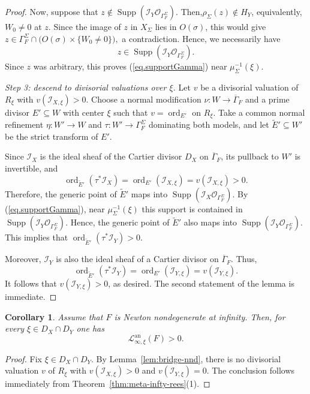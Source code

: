 \documentclass[12pt]{amsart}
\newcommand{\Supp}{\operatorname{\mathrm{Supp}}}
\newcommand{\ord}{\operatorname{\mathrm{ord}}}
\newcommand{\cO}{\mathcal{O}}
\newcommand{\Loj}{\mathcal{L}} %
\theoremstyle{plain}
\newtheorem{corollary}[theorem]{Corollary}
\theoremstyle{definition}
\numberwithin{equation}{section}
\begin{document}
\begin{proof}
	Now, suppose that $z\notin \Supp (\mathscr{I}_Y\cO_{\Gamma_F^\Sigma}).$
	Then,$\rho_\Sigma(z)\notin H_Y$, equivalently, $W_0\neq 0$ at $z$. Since the image of $z$ in
	$X_\Sigma$ lies in $O(\sigma)$, this would give $z\in \Gamma_F^\Sigma\cap \bigl(O(\sigma)\times\{W_0\neq 0\}\bigr),$ a contradiction. Hence, we necessarily have
	\[
	z\in \Supp (\mathscr{I}_Y\cO_{\Gamma_F^\Sigma}).
	\]
	Since $z$ was arbitrary, this proves (\ref{eq.supportGamma}) near $\mu_\Sigma^{-1}(\xi)$.
	
	\smallskip
	\noindent\emph{Step 3: descend to divisorial valuations over $\xi$.}
	Let $v$ be a divisorial valuation of $R_\xi$ with $v(\mathscr{I}_{X,\xi})>0.$
	Choose a normal modification $\nu:W\to \overline{\Gamma}_F$ and a prime divisor $E'\subseteq W$
	with center $\xi$ such that $v=\ord_{E'}$ on $R_\xi$.
	Take a common normal refinement $\eta: W'\to W$ and $\tau: W'\to \Gamma_F^\Sigma$ dominating both models,
	and let $\widetilde E'\subseteq W'$ be the strict transform of $E'$.
	
Since $\mathscr{I}_X$ is the ideal sheaf of the Cartier divisor $D_X$ on $\overline{\Gamma}_F$, its
	pullback to $W'$ is invertible, and
	\[
	\ord_{\widetilde E'}(\tau^*\mathscr{I}_X)
	=
	\ord_{E'}(\mathscr{I}_{X,\xi})
	=
	v(\mathscr{I}_{X,\xi})
	>0.
	\]
	Therefore, the generic point of $\widetilde E'$ maps into $\Supp (\mathscr{I}_X\cO_{\Gamma_F^\Sigma}).$
	By (\ref{eq.supportGamma}), near $\mu_\Sigma^{-1}(\xi)$ this support is contained in $\Supp (\mathscr{I}_Y\cO_{\Gamma_F^\Sigma}).$ Hence, the generic point of $\widetilde E'$ also maps into $\Supp (\mathscr{I}_Y\cO_{\Gamma_F^\Sigma}).$ This implies that $\ord_{\widetilde E'}(\tau^*\mathscr{I}_Y)>0.$

Moreover, $\mathscr{I}_Y$ is also the ideal sheaf of a Cartier divisor on $\overline{\Gamma}_F$. Thus,
	\[
	\ord_{\widetilde E'}(\tau^*\mathscr{I}_Y)
	=
	\ord_{E'}(\mathscr{I}_{Y,\xi})
	=
	v(\mathscr{I}_{Y,\xi}).
	\]
	It follows that $v(\mathscr{I}_{Y,\xi})>0$, as desired.
The second statement of the lemma is immediate.
\end{proof}


\begin{corollary}\label{cor:meta-infty-nondeg-finite}
	Assume that $F$ is Newton nondegenerate at infinity.
	Then, for every $\xi\in D_X\cap D_Y$ one has
	\[
	\Loj^{\text{an}}_{\infty,\xi}(F) > 0.
	\]
\end{corollary}

\begin{proof}
	Fix $\xi\in D_X\cap D_Y$. By Lemma~\ref{lem:bridge-nnd}, there is no divisorial valuation $v$ of $R_\xi$
	with $v(\mathscr I_{X,\xi})>0$ and $v(\mathscr I_{Y,\xi})=0$. The conclusion follows immediately from
	Theorem~\ref{thm:meta-infty-rees}(1).
\end{proof}
\end{document}
